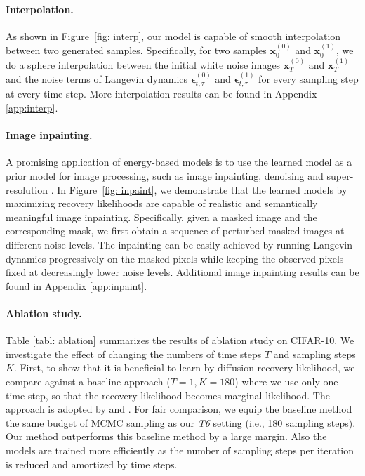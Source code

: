 \documentclass{article} \usepackage{iclr2021_conference,times}
\def\Figref#1{Figure~\ref{#1}}
\def\rvx{{\mathbf{x}}}
\def\beps{\bm{\epsilon}}
\begin{document}
\paragraph{Interpolation.} As shown in \Figref{fig: interp}, our model is capable of smooth interpolation between two generated samples. Specifically, for two samples $\rvx_0^{(0)}$ and $\rvx_0^{(1)}$, we do a sphere interpolation between the initial white noise images $\rvx_T^{(0)}$ and $\rvx_T^{(1)}$ and the noise terms of Langevin dynamics $\beps_{t, \tau}^{(0)}$ and $\beps_{t, \tau}^{(1)}$ for every sampling step at every time step. More interpolation results can be found in Appendix \ref{app:interp}. 

\paragraph{Image inpainting.} A promising application of energy-based models is to use the learned model as a prior model for image processing, such as image inpainting, denoising and super-resolution \citep{gao2018learning, du2019implicit, song2019generative}. In \Figref{fig: inpaint}, we demonstrate that the learned models by maximizing recovery likelihoods are capable of realistic and semantically meaningful image inpainting. Specifically, given a masked image and the corresponding mask, we first obtain a sequence of perturbed masked images at different noise levels. The inpainting can be easily achieved by running Langevin dynamics progressively on the masked pixels while keeping the observed pixels fixed at decreasingly lower noise levels. Additional image inpainting results can be found in Appendix \ref{app:inpaint}.

\paragraph{Ablation study.}
Table \ref{tabl: ablation} summarizes the results of ablation study on CIFAR-10. We investigate the effect of changing the numbers of time steps $T$ and sampling steps $K$. First, to show that it is beneficial to learn by diffusion recovery likelihood, we compare against a baseline approach ($T=1, K = 180$) where we use only one time step, so that the recovery likelihood becomes marginal likelihood. The approach is adopted by \citet{nijkamp2019learning} and \citet{du2019implicit}. For fair comparison, we equip the baseline method the same budget of MCMC sampling as our {\em T6} setting (i.e., 180 sampling steps). Our method outperforms this baseline method by a large margin. Also the models are trained more efficiently as the number of sampling steps per iteration is reduced and amortized by time steps. 
\end{document}
